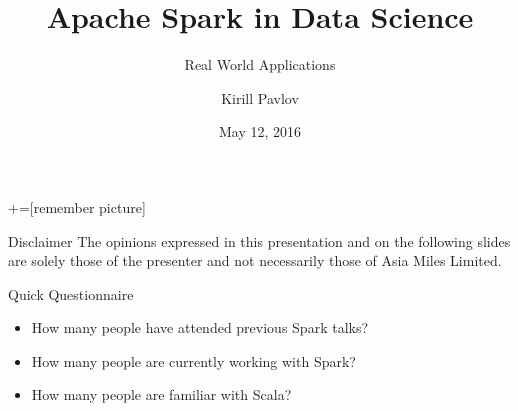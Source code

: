 \documentclass[unicode, notheorems]{beamer}
\title{Apache Spark in Data Science}
\subtitle{Real World Applications}
\author{Kirill Pavlov}
\institute[]{Data Science Team, Asia Miles Limited}
\date{May 12, 2016}
\begin{document}
+=[remember picture]

\everymath{\displaystyle}


\begin{frame}
\titlepage
\end{frame}


\begin{frame}{Disclaimer}
The opinions expressed in this presentation and on the following slides are solely those of the presenter and not necessarily those of Asia Miles Limited.
\end{frame}


\begin{frame}{Quick Questionnaire}
\begin{itemize}
\item How many people have attended previous Spark talks? \pause
\item How many people are currently working with Spark? \pause
\item How many people are familiar with Scala?
\end{itemize}
\end{frame}
\end{document}
